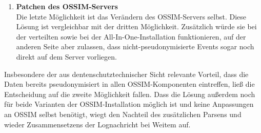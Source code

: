 \begin{enumerate}
\item \textbf{Patchen des OSSIM-Servers}\\
  Die letzte Möglichkeit ist das Verändern des OSSIM-Servers selbst. Diese Lösung ist vergleichbar mit der dritten Möglichkeit. Zusätzlich würde sie bei der verteilten sowie bei der All-In-One-Installation funktionieren, auf der anderen Seite aber zulassen, dass nicht-pseudonymisierte Events sogar noch direkt auf dem Server vorliegen.

\end{enumerate}

Insbesondere der aus dentenschutztechnischer Sicht relevante Vorteil, dass die Daten bereits pseudonymisiert in allen OSSIM-Komponenten eintreffen, ließ die Entscheidung auf die zweite Möglichkeit fallen. Dass die Lösung außerdem noch für beide Varianten der OSSIM-Installation möglich ist und keine Anpassungen an OSSIM selbst benötigt, wiegt den Nachteil des zusätzlichen Parsens und wieder Zusammensetzens der Lognachricht bei Weitem auf.